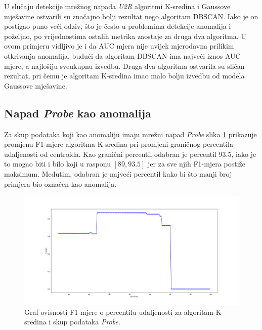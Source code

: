 \documentclass[utf8, diplomski, numeric]{fer}
\begin{document}
U slučaju detekcije mrežnog napada \textit{U2R} algoritmi K-sredina i Gaussove mješavine ostvarili su značajno bolji rezultat nego algoritam DBSCAN. Iako je on postigao puno veći odziv, što je često u problemima detekcije anomalija i poželjno, po vrijednostima ostalih metrika zaostaje za druga dva algoritma. U ovom primjeru vidljivo je i da AUC mjera nije uvijek mjerodavna prilikim otkrivanja anomalija, budući da algoritam DBSCAN ima najveći iznos AUC mjere, a najlošiju sveukupnu izvedbu. Druga dva algoritma ostvarila su sličan rezultat, pri čemu je algoritam K-sredina imao malo bolju izvedbu od modela Gaussove mješavine.

\subsection{Napad \textit{Probe} kao anomalija}
Za skup podataka koji kao anomaliju imaju mrežni napad \textit{Probe} slika \ref{fig:probe-kmeans} prikazuje promjenu F1-mjere algoritma K-sredina pri promjeni graničnog percentila udaljenosti od centroida. Kao granični percentil odabran je percentil 93.5, iako je to mogao biti i bilo koji u rasponu $[89, 93.5]$ jer za sve njih F1-mjera postiže maksimum. Međutim, odabran je najveći percentil kako bi što manji broj primjera bio označen kao anomalija.

\begin{figure}[h!]
\includegraphics[width=1\textwidth]{images/probe-kmeans-f1.png}
\centering
\caption{Graf ovisnosti F1-mjere o percentilu udaljenosti za algoritam K-sredina i skup podataka \textit{Probe}.}
\label{fig:probe-kmeans}
\end{figure}
\end{document}

